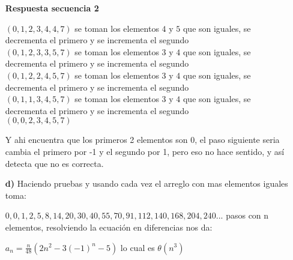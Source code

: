 \documentclass[12pt]{article}
\begin{document}
\begin{itemize}
  \item[\bf{Respuesta secuencia 2}]

    $(0,1,2,3,4,4,7)$
    se toman los elementos $4$ y $5$ que son iguales, se decrementa el primero y se incrementa el segundo\\
    $(0,1,2,3,3,5,7)$
    se toman los elementos $3$ y $4$ que son iguales, se decrementa el primero y se incrementa el segundo\\
    $(0,1,2,2,4,5,7)$
    se toman los elementos $3$ y $4$ que son iguales, se decrementa el primero y se incrementa el segundo\\
    $(0,1,1,3,4,5,7)$
    se toman los elementos $3$ y $4$ que son iguales, se decrementa el primero y se incrementa el segundo\\
    $(0,0,2,3,4,5,7)$

    Y ahi encuentra que los primeros 2 elementos son 0, el paso siguiente seria cambia el primero por -1 y el segundo por 1, pero eso no hace sentido, y así detecta que no es correcta.

  \item[\bf{d)}]
Haciendo pruebas y usando cada vez el arreglo con mas elementos iguales toma:

$0, 0, 1, 2, 5, 8, 14, 20, 30, 40, 55, 70, 91, 112, 140, 168, 204, 240...$ pasos con n elementos, resolviendo la ecuación en diferencias nos da:

$a_n = {\frac{n}{48}}(2 n^2-3 (-1)^n-5)$ lo cual es $\theta(n^3)$
 


\end{itemize}
\end{document}
